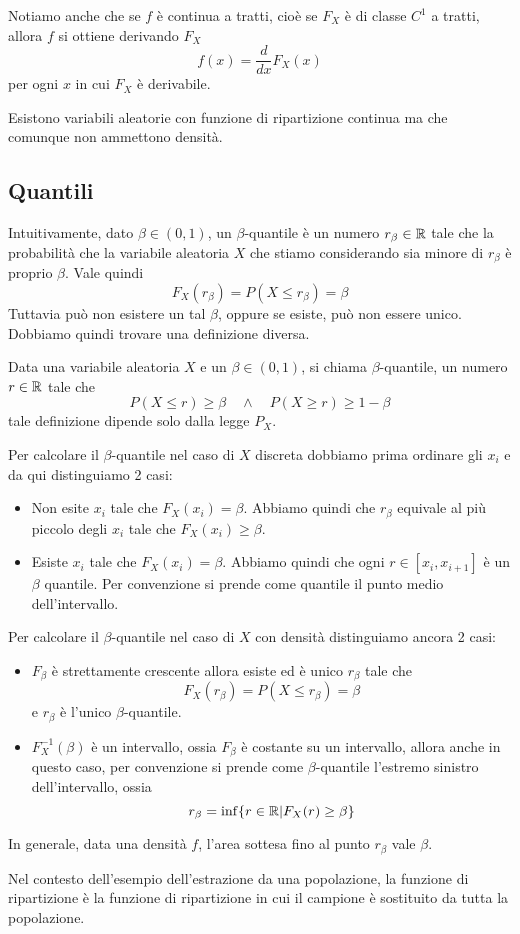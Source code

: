 \begin{observation}
	Notiamo anche che se $f$ è continua a tratti, cioè
	se $F_X$ è di classe $C^1$ a tratti, allora $f$ si ottiene derivando $F_X$
	\[ f(x) = \frac{d}{dx} F_X (x) \]
	per ogni $x$ in cui $F_X$ è derivabile.
\end{observation}

\begin{observation}
	Esistono variabili aleatorie con funzione di ripartizione continua ma che comunque non
	ammettono densità.
\end{observation}

\subsection{Quantili}
Intuitivamente, dato $\beta \in (0,1)$, un $\beta$-quantile è un numero $r_\beta \in \mathbb{R}$ tale che
la probabilità che la variabile aleatoria $X$ che stiamo considerando sia minore di $r_\beta$ è
proprio $\beta$. Vale quindi
\[ F_X (r_\beta) = P(X \leq r_\beta) = \beta \]
Tuttavia può non esistere un tal $\beta$, oppure se esiste, può non essere unico. Dobbiamo quindi
trovare una definizione diversa.

\begin{definition}
	Data una variabile aleatoria $X$ e un $\beta \in (0,1)$, si chiama $\beta$-quantile, un numero
	$r \in \mathbb{R}$ tale che
	\[ P(X \leq r) \geq \beta \quad \land \quad P(X \geq r) \geq 1 - \beta \]
	tale definizione dipende solo dalla legge $P_X$.
\end{definition}

Per calcolare il $\beta$-quantile nel caso di $X$ discreta dobbiamo prima ordinare gli $x_i$ e da
qui distinguiamo 2 casi:
\begin{itemize}
	\item Non esite $x_i$ tale che $F_X(x_i) = \beta$. Abbiamo quindi che $r_\beta$ equivale al più
	      piccolo degli $x_i$ tale che $F_X(x_i) \geq \beta$.
	\item Esiste $x_i$ tale che $F_X(x_i) = \beta$. Abbiamo quindi che ogni $r \in [x_i, x_{i+1}]$
	      è un $\beta$ quantile. Per convenzione si prende come quantile il punto medio
	      dell'intervallo.
\end{itemize}
Per calcolare il $\beta$-quantile nel caso di $X$ con densità distinguiamo ancora 2 casi:
\begin{itemize}
	\item $F_\beta$ è strettamente crescente allora esiste ed è unico $r_\beta$ tale che
	      \[ F_X(r_\beta) = P(X \leq r_\beta) = \beta \]
	      e $r_\beta$ è l'unico $\beta$-quantile.
	\item $F_X^{-1} (\beta)$ è un intervallo, ossia $F_\beta$ è costante su un intervallo, allora
	      anche in questo caso, per convenzione si prende come $\beta$-quantile l'estremo sinistro
	      dell'intervallo, ossia
	      \[ r_\beta = \inf \{ r \in \mathbb{R} | F_X(r) \geq \beta \} \]
\end{itemize}
In generale, data una densità $f$, l'area sottesa fino al punto $r_\beta$ vale $\beta$.

\begin{observation}
	Nel contesto dell'esempio dell'estrazione da una popolazione, la funzione di ripartizione è la
	funzione di ripartizione in cui il campione è sostituito da tutta la popolazione.
\end{observation}